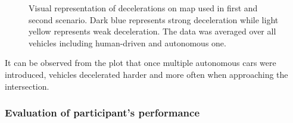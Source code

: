 \documentclass[11pt,english]{article}
\begin{document}
\begin{figure}[h]
\centering
{}


\caption{Visual representation of decelerations on map used in first and second scenario. Dark blue represents strong deceleration while light yellow represents weak deceleration. The data was averaged over all vehicles including human-driven and autonomous one.}
\label{fig:decelerations1}
\end{figure}

It can be observed from the plot that once multiple autonomous cars were introduced, vehicles decelerated harder and more often when approaching the intersection.







\subsubsection{Evaluation of participant's performance}
\paragraph{}
\end{document}

